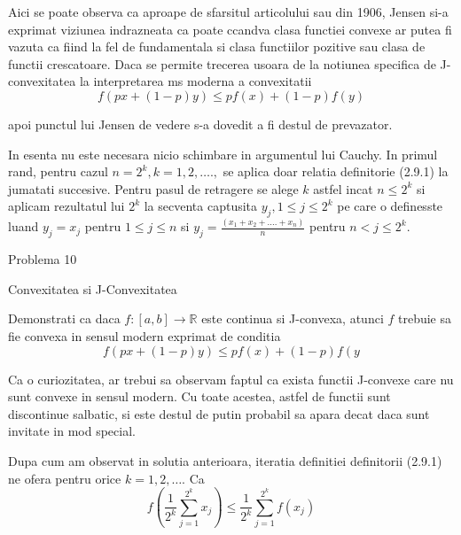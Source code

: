 \documentclass[a4paper,12pt,oneside]{report}
\begin{document}
Aici se poate observa ca aproape de sfarsitul articolului sau din 1906, Jensen si-a exprimat viziunea indrazneata ca poate ccandva clasa functiei convexe ar putea fi vazuta ca fiind la fel de fundamentala si clasa functiilor pozitive sau clasa de functii crescatoare. Daca se permite trecerea usoara de la notiunea specifica de J-convexitatea la interpretarea ms moderna a convexitatii 
\begin{displaymath}
  f\left ( px + \left ( 1 - p \right )y \right )\leq pf\left ( x \right ) + \left ( 1-p \right )f\left ( y \right)
\end{displaymath} 

apoi punctul lui Jensen de vedere s-a dovedit a fi destul de prevazator. 

In esenta nu este necesara nicio schimbare in argumentul lui Cauchy. In primul rand, pentru cazul \(n = 2^{k}, k=1,2,….,\)  se aplica doar relatia definitorie (2.9.1) la jumatati succesive. Pentru pasul de retragere se alege \(k\) astfel incat \(n\leq 2^{k}\) si aplicam rezultatul lui \(2^{k}\) la secventa captusita \(y_{j} , 1\leq j\leq 2^{k}\) pe care o definesste luand \(y_{j} = x_{j}\) pentru \(1\leq j\leq n \) si \(y_{j} = \frac{\left ( x_{1} + x_{2} + ....+ x_{n} \right )}{n}\) pentru \(n< j\leq 2^{k}\). 


Problema 10

Convexitatea si J-Convexitatea 

Demonstrati ca daca \(f : \left [ a,b \right ]\rightarrow \mathbb{R} \) este continua si J-convexa, atunci \(f\) trebuie sa fie convexa in sensul modern exprimat de conditia 
\begin{displaymath}
  f\left ( px + \left ( 1 - p \right )y \right )\leq pf\left ( x \right ) + \left ( 1-p \right )f\left ( y \right.
\end{displaymath}
 
Ca o curiozitatea, ar trebui sa observam faptul ca exista functii J-convexe care nu sunt convexe in sensul modern. Cu toate acestea, astfel de functii sunt discontinue salbatic, si este destul de putin probabil sa apara decat daca sunt invitate in mod special. 

Dupa cum am observat in solutia anterioara, iteratia definitiei definitorii (2.9.1) ne ofera pentru orice \(k = 1,2,….\) Ca 
\begin{displaymath}
  f\left ( \frac{1}{2^{k}} \sum_{j = 1}^{2^{k}}x_{j}\right ) \leq  \frac{1}{2^{k}}\sum_{j = 1}^{2^{k}}f\left ( x_{j}\right )
\end{displaymath}
\end{document}
